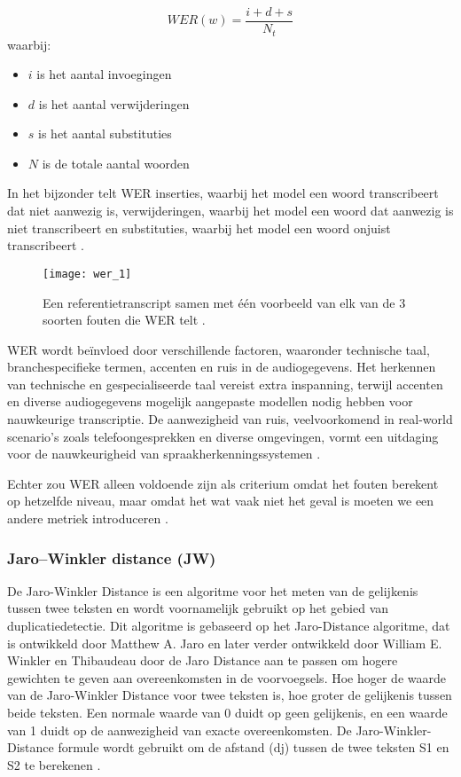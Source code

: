 \begin{equation}
   WER(w) = \frac{i + d + s}{N_t}
\end{equation}
waarbij:
\begin{itemize}
    \item \(i\) is het aantal invoegingen
    \item \(d\) is het aantal verwijderingen
    \item \(s\) is het aantal substituties
    \item \(N\) is de totale aantal woorden
\end{itemize}

In het bijzonder telt WER inserties, waarbij het model een woord transcribeert dat niet aanwezig is, verwijderingen, waarbij het model een woord dat aanwezig is niet transcribeert en substituties, waarbij het model een woord onjuist transcribeert
\autocite{OConnor2023}.
\begin{figure}[htbp]
    \centering
    \texttt{[image: wer\_1]}
    \caption{Een referentietranscript samen met één voorbeeld van elk van de 3 soorten fouten die WER telt \autocite{OConnor2023}.}
    \label{fig:WER count}
\end{figure}

WER wordt beïnvloed door verschillende factoren, waaronder technische taal, branchespecifieke termen, accenten en ruis in de audiogegevens. Het herkennen van technische en gespecialiseerde taal vereist extra inspanning, terwijl accenten en diverse audiogegevens mogelijk aangepaste modellen nodig hebben voor nauwkeurige transcriptie. De aanwezigheid van ruis, veelvoorkomend in real-world scenario's zoals telefoongesprekken en diverse omgevingen, vormt een uitdaging voor de nauwkeurigheid van spraakherkenningssystemen \autocite{Gevirtz2018}.

Echter zou WER alleen voldoende zijn als criterium omdat het fouten berekent op hetzelfde niveau, maar omdat het wat vaak niet het geval is moeten we een andere metriek introduceren \autocite{OConnor2023}.
\subsubsection{Jaro–Winkler distance (JW)}


De Jaro-Winkler Distance is een algoritme voor het meten van de gelijkenis tussen twee teksten en wordt voornamelijk gebruikt op het gebied van duplicatiedetectie. Dit algoritme is gebaseerd op het Jaro-Distance algoritme, dat is ontwikkeld door Matthew A. Jaro en later verder ontwikkeld door William E. Winkler en Thibaudeau door de Jaro Distance aan te passen om hogere gewichten te geven aan overeenkomsten in de voorvoegsels. Hoe hoger de waarde van de Jaro-Winkler Distance voor twee teksten is, hoe groter de gelijkenis tussen beide teksten. Een normale waarde van 0 duidt op geen gelijkenis, en een waarde van 1 duidt op de aanwezigheid van exacte overeenkomsten. De Jaro-Winkler-Distance formule wordt gebruikt om de afstand (dj) tussen de twee teksten  S1 en S2 te berekenen \autocite{Brinardi2017}.

